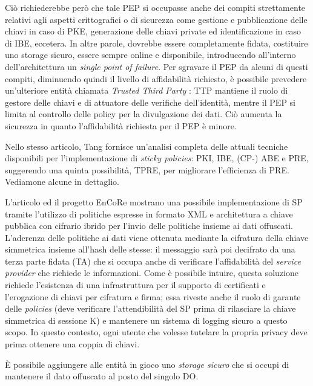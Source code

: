 Ci\`o richiederebbe per\`o che tale PEP si occupasse anche dei compiti strettamente relativi agli aspetti crittografici o di sicurezza come gestione e pubblicazione delle chiavi in caso di PKE, generazione delle chiavi private ed identificazione in caso di IBE, eccetera. In altre parole, dovrebbe essere completamente fidata, costituire uno storage sicuro, essere sempre online e disponibile, introducendo all’interno dell’architettura un \textit{single point of failure}. Per sgravare il PEP da alcuni di questi compiti, diminuendo quindi il livello di affidabilità richiesto, è possibile prevedere un'ulteriore entit\`a chiamata \textit{Trusted Third Party} \cite{tang2008using}: TTP mantiene il ruolo di gestore delle chiavi e di attuatore delle verifiche dell’identit\`a, mentre il PEP si limita al controllo delle policy per la divulgazione dei dati. Ci\`o aumenta la sicurezza in quanto l’affidabilit\`a richiesta per il PEP \`e minore.

Nello stesso articolo, Tang fornisce un’analisi completa delle attuali tecniche disponibili per l’implementazione di \textit{sticky policies}: PKI, IBE, (CP-) ABE e PRE, suggerendo una quinta possibilit\`a, TPRE, per migliorare l’efficienza di PRE. Vediamone alcune in dettaglio.

L’articolo \cite{pearson2011sticky} ed il progetto EnCoRe mostrano una possibile implementazione di SP tramite l’utilizzo di politiche espresse in formato XML e architettura a chiave pubblica con cifrario ibrido per l’invio delle politiche insieme ai dati offuscati. L’aderenza delle politiche ai dati viene ottenuta mediante la cifratura della chiave simmetrica insieme all’hash delle stesse: il messaggio sar\`a poi decifrato da una terza parte fidata (TA) che si occupa anche di verificare l’affidabilit\`a del \textit{service provider} che richiede le informazioni. Come \`e possibile intuire, questa soluzione richiede l’esistenza di una infrastruttura per il supporto di certificati e l’erogazione di chiavi per cifratura e firma; essa riveste anche il ruolo di garante delle \textit{policies} (deve verificare l’attendibilit\`a del SP prima di rilasciare la chiave simmetrica di sessione K) e mantenere un sistema di logging sicuro a questo scopo. In questo contesto, ogni utente che volesse tutelare la propria privacy deve prima ottenere una coppia di chiavi. 

\`E possibile aggiungere alle entit\`a in gioco uno \textit{storage sicuro} che si occupi di mantenere il dato offuscato al posto del singolo DO.

